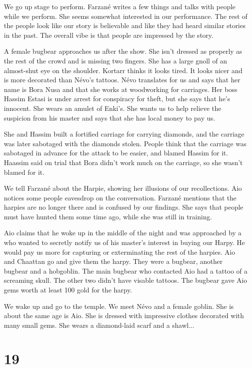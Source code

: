 \documentclass[10pt,a4paper,twoside,openany,hidelinks]{book}
\begin{document}
We go up stage to perform. Farzané writes a few things and talks with people while we perform. She seems somewhat interested in our performance. The rest of the people look like our story is believable and like they had heard similar stories in the past. The overall vibe is that people are impressed by the story.

A female bugbear approaches us after the show. She isn't dressed as properly as the rest of the crowd and is missing two fingers. She has a large gnoll of an almost-shut eye on the shoulder. Kortarr thinks it looks tired. It looks nicer and is more decorated than Névo's tattoos.
Névo translates for us and says that her name is Bora Nusa and that she works at woodworking for carriages. Her boss Hassim Estasi is under arrest for conspiracy for theft, but she says that he's innocent. She wears an amulet of Enki's. She wants us to help relieve the suspicion from his master and says that she has local money to pay us.

She and Hassim built a fortified carriage for carrying diamonds, and the carriage was later sabotaged with the diamonds stolen. People think that the carriage was sabotaged in advance for the attack to be easier, and blamed Hassim for it. Haassim said on trial that Bora didn't work much on the carriage, so she wasn't blamed for it.

We tell Farzané about the Harpie, showing her illusions of our recollections. Aio notices some people eavesdrop on the conversation. Farzané mentions that the harpies are no longer there and is confused by our findings. She says that people must have hunted them some time ago, while she was still in training.

Aio claims that he woke up in the middle of the night and was approached by a who wanted to secretly notify us of his master's interest in buying our Harpy. He would pay us more for capturing or exterminating the rest of the harpies. Aio and Chaattan go and give them the harpy. They were a bugbear, another bugbear and a hobgoblin. The main bugbear who contacted Aio had a tattoo of a screaming skull. The other two didn't have visable tattoos. The bugbear gave Aio gems worth at least 100 gold for the harpy.

We wake up and go to the temple. We meet Névo and a female goblin. She is about the same age is Aio. She is dressed with impressive clothes decorated with many small gems. She wears a diamond-laid scarf and a shawl...

\chapter*{19}
\end{document}
